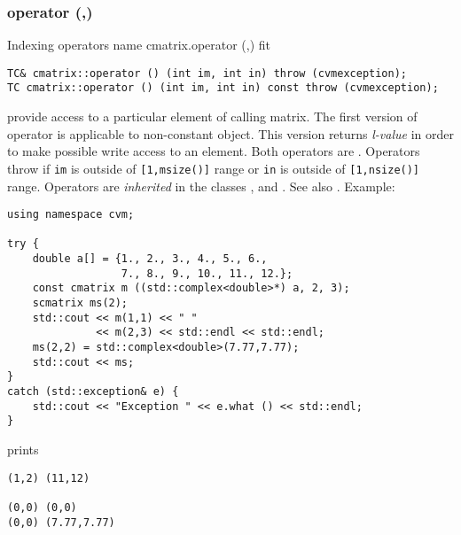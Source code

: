 \subsubsection{operator (,)}
Indexing operators%
\pdfdest name {cmatrix.operator (,)} fit
\begin{verbatim}
TC& cmatrix::operator () (int im, int in) throw (cvmexception);
TC cmatrix::operator () (int im, int in) const throw (cvmexception);
\end{verbatim}
provide access to a particular element of calling matrix. The first version
of operator is applicable to  non-constant object.
This version returns  \emph{l-value}
in order to make possible write access to an element.
Both operators are \Based.
Operators throw 
if \verb"im" is outside of \verb"[1,msize()]" range or
\verb"in" is outside of \verb"[1,nsize()]" range.
Operators are \emph{inherited}
in the classes
,  
and .
See also .
Example:
\begin{Verbatim}
using namespace cvm;

try {
    double a[] = {1., 2., 3., 4., 5., 6.,
                  7., 8., 9., 10., 11., 12.};
    const cmatrix m ((std::complex<double>*) a, 2, 3);
    scmatrix ms(2);
    std::cout << m(1,1) << " " 
              << m(2,3) << std::endl << std::endl;
    ms(2,2) = std::complex<double>(7.77,7.77);
    std::cout << ms;
}
catch (std::exception& e) {
    std::cout << "Exception " << e.what () << std::endl;
}
\end{Verbatim}
prints
\begin{Verbatim}
(1,2) (11,12)

(0,0) (0,0)
(0,0) (7.77,7.77)
\end{Verbatim}
\newpage





